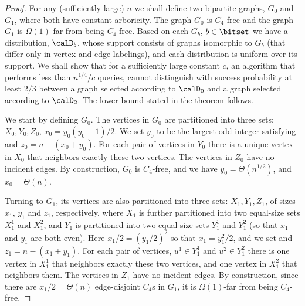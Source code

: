 \begin{proof}
For any (sufficiently large) $n$ we shall define two bipartite graphs, $G_0$ and $G_1$, where both have constant arboricity. The graph $G_0$ is $C_4$-free and  the graph $G_1$ is $\Omega(1)$-far from being $C_4$ free.
Based on each $G_b$, $b\in \bitset$ we have a distribution, $\calD_b$, whose support consists of graphs isomorphic to $G_b$ (that differ only in vertex and edge labelings), and each distribution is uniform over its support.
We shall show that for a sufficiently large constant $c$, an algorithm that performs less than $n^{1/4}/c$ queries, cannot distinguish with success probability at least $2/3$ between a graph selected according to $\calD_0$ and a graph selected according to $\calD_2$. The lower bound stated in the theorem follows.

We start by defining $G_0$. The vertices in $G_0$ are partitioned into three sets: $X_0,Y_0,Z_0$, 
 $x_0 = y_0(y_0-1)/2$. We set $y_0$ to be the largest odd integer satisfying 
 and $z_0 = n-(x_0+y_0)$.
For each pair of vertices in $Y_0$ there is a unique vertex in $X_0$ that neighbors exactly these two vertices.
The vertices in $Z_0$ have no incident edges.
By construction, $G_0$ is $C_4$-free, and we have $y_0 = \Theta(n^{1/2})$, 
and $x_0 = \Theta(n)$.

Turning to $G_1$, its vertices are also partitioned into three sets: $X_1,Y_1,Z_1$, of sizes $x_1$, $y_1$ and $z_1$, respectively, where $X_1$ is further partitioned into two equal-size sets $X_1^1$ and $X_1^2$, and $Y_1$ is partitioned into two equal-size sets $Y_1^1$ and $Y_1^2$ (so that $x_1$ and $y_1$ are both even).
Here $x_1/2 = (y_1/2)^2$ so that $x_1 = y_1^2/2$, and we set 
and $z_1 = n- (x_1+y_1)$. For each pair of vertices, $u^1 \in Y_1^1$ and $u^2 \in Y_1^2$ there is one vertex in $X_1^1$ that neighbors exactly these two vertices, and one vertex in $X_1^2$ that neighbors them. The vertices in $Z_1$ have
no incident edges. By construction, since there are $x_1/2 = \Theta(n)$ edge-disjoint $C_4$s in $G_1$, it is $\Omega(1)$-far from being $C_4$-free.


\end{proof}
